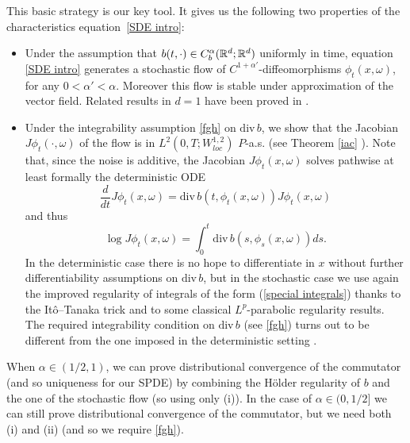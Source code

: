 \documentclass[a4paper,11pt]{article}
\begin{document}
This basic strategy is our key tool. It gives us the following two
properties of the characteristics equation~\eqref{SDE intro}:

\begin{itemize}
\item[(i)]  Under the assumption that $b(t,\cdot )\in C_{b}^{{\alpha }}({%
\mathbb{R}}^{d};{\mathbb{R}}^{d})$ uniformly in time, equation~%
\eqref{SDE intro} generates a stochastic flow of $C^{1 +
\alpha'}$-diffeomorphisms $\phi _{t}\left( x,\omega \right) $, for
any $0< \alpha' < \alpha$. Moreover this flow is stable under
approximation of the vector field. Related results in $d=1$ have
been proved in \cite{FR}.

\item[(ii)]  Under the integrability assumption
\eqref{fgh} on $\mathrm{div}\,b$, we show that the Jacobian $J\phi
_{t}(\cdot ,\omega )$
of the flow is in $L^{2}(0,T;W_{loc}^{1,2})$ $P$-a.s. (see Theorem \ref{iac}%
). Note that, since the noise is additive, the Jacobian $J\phi
_{t}(x,\omega )$ solves pathwise at least formally the deterministic
ODE
\begin{equation*}
\frac{d}{dt}J\phi _{t}(x,\omega )={\mathrm{div}\,}b(t,\phi _{t}(x,\omega
))J\phi _{t}(x,\omega )
\end{equation*}
and thus
\begin{equation*}
\log J\phi _{t}(x,\omega )=\int_{0}^{t}{\mathrm{div}\,}b(s,\phi
_{s}(x,\omega ))ds.
\end{equation*}
In the deterministic case there is no hope to differentiate in $x$
without further differentiability assumptions on
${\mathrm{div}\,}b$, but in the stochastic case we use again the
improved regularity of integrals of the form (\ref{special
integrals}) thanks to the It\^{o}--Tanaka trick and to some
 classical $L^p$-parabolic regularity results.
  The
required integrability condition on ${\mathrm{div}\,}b$ (see
\eqref{fgh}) turns out to be different from the one imposed in the
deterministic setting \cite {DiPernaLions,Ambrosio}.
\end{itemize}
 When $\alpha \in (1/2, 1)$, we can prove distributional
   convergence of the
 commutator (and so uniqueness for our SPDE)
  by combining    the H\"older regularity  of
   $b$ and   the one of the stochastic flow (so using only (i)).
In the case of $\alpha \in (0, 1/2]$    we can still prove
distributional
 convergence of the
 commutator, but we need  both  (i) and (ii) (and so we
 require \eqref{fgh}).
\end{document}
